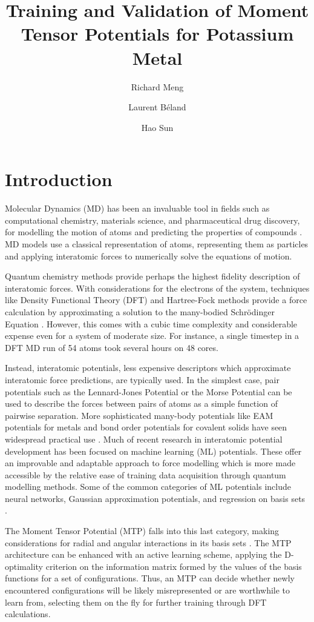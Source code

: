 \documentclass[9pt,twocolumn,twoside]{opticajnl}
\title{Training and Validation of Moment Tensor Potentials for Potassium Metal}
\author[1,2,3]{ Richard Meng}
\author[1]{Laurent Béland}
\author[1]{Hao Sun}
\affil[1]{Department of Mechanical and Materials Engineering, Queen's University, 45 Union St, Kingston, ON K7L 3N6}
\affil[2]{contact@richardzjm.com}
\affil[3]{17zjm1@queensu.ca}
\begin{document}
\maketitle

\section{Introduction}
Molecular Dynamics (MD) has been an invaluable tool in fields such as computational chemistry, materials science, and pharmaceutical drug discovery, for modelling the motion of atoms and predicting the properties of compounds \cite{karplus2002molecular}. MD models use a classical representation of atoms, representing them as particles and applying interatomic forces to numerically solve the equations of motion.

Quantum chemistry methods provide perhaps the highest fidelity description of interatomic forces. With considerations for the electrons of the system, techniques like Density Functional Theory (DFT) and Hartree-Fock methods provide a force calculation by approximating a solution to the many-bodied Schrödinger Equation \cite{DFT}. However, this comes with a cubic time complexity and considerable expense even for a system of moderate size. For instance,  a single timestep in a DFT MD run of 54 atoms took several hours on 48 cores. 

Instead, interatomic potentials, less expensive descriptors which approximate interatomic force predictions, are typically used. In the simplest case, pair potentials such as the Lennard-Jones Potential or the Morse Potential can be used to describe the forces between pairs of atoms as a simple function of pairwise separation. More sophisticated many-body potentials like EAM potentials for metals and bond order potentials for covalent solids have seen widespread practical use \cite{MatSci}. Much of recent research in interatomic potential development has been focused on machine learning (ML) potentials. These offer an improvable and adaptable approach to force modelling which is more made accessible by the relative ease of training data acquisition through quantum modelling methods. Some of the common categories of ML potentials include neural networks, Gaussian approximation potentials, and regression on basis sets \cite{mlip}.

The Moment Tensor Potential (MTP) falls into this last category, making considerations for radial and angular interactions in its basis sets \cite{mtp}. The MTP architecture can be enhanced with an active learning scheme, applying the D-optimality criterion on the information matrix formed by the values of the basis functions for a set of configurations. Thus, an MTP can decide whether newly encountered configurations will be likely misrepresented or are worthwhile to learn from, selecting them on the fly for further training through DFT calculations.
\end{document}
